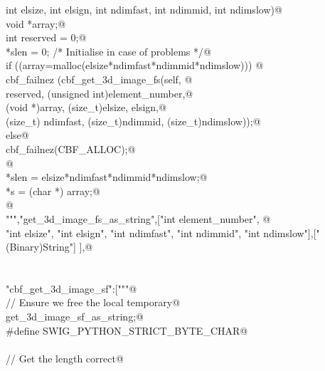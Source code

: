 \documentclass[10pt,a4paper,twoside,notitlepage]{article}
\begin{document}
\begin{flushleft}
\begin{minipage}{\linewidth}
\begin{list}{}{}
\mbox{}\verb@    int elsize, int elsign, int ndimfast, int ndimmid, int ndimslow){@\\
\mbox{}\verb@        void *array;@\\
\mbox{}\verb@        int reserved = 0;@\\
\mbox{}\verb@        *slen = 0; /* Initialise in case of problems */@\\
\mbox{}\verb@        if ((array=malloc(elsize*ndimfast*ndimmid*ndimslow))) {@\\
\mbox{}\verb@               cbf_failnez (cbf_get_3d_image_fs(self, @\\
\mbox{}\verb@               reserved, (unsigned int)element_number,@\\
\mbox{}\verb@               (void *)array, (size_t)elsize, elsign,@\\
\mbox{}\verb@               (size_t) ndimfast, (size_t)ndimmid, (size_t)ndimslow));@\\
\mbox{}\verb@         }else{@\\
\mbox{}\verb@               cbf_failnez(CBF_ALLOC);@\\
\mbox{}\verb@         }@\\
\mbox{}\verb@        *slen = elsize*ndimfast*ndimmid*ndimslow;@\\
\mbox{}\verb@        *s = (char *) array;@\\
\mbox{}\verb@      }@\\
\mbox{}\verb@""","get_3d_image_fs_as_string",["int element_number", @\\
\mbox{}\verb@    "int elsize", "int elsign", "int ndimfast", "int ndimmid", "int ndimslow"],["(Binary)String"] ],@\\
\mbox{}\verb@@\\
\mbox{}\verb@@\\
\mbox{}\verb@"cbf_get_3d_image_sf":["""@\\
\mbox{}\verb@// Ensure we free the local temporary@\\
\mbox{}\verb@%cstring_output_allocate_size(char ** s, int *slen, free(*$1))@\\
\mbox{}\verb@       get_3d_image_sf_as_string;@\\
\mbox{}\verb@%{@\\
\mbox{}\verb@#define SWIG_PYTHON_STRICT_BYTE_CHAR@\\
\mbox{}\verb@%}@\\
\mbox{}\verb@@\\
\mbox{}\verb@// Get the length correct@\\
\mbox{}\verb@@\\

\end{list}
\end{minipage}
\end{flushleft}
\end{document}
